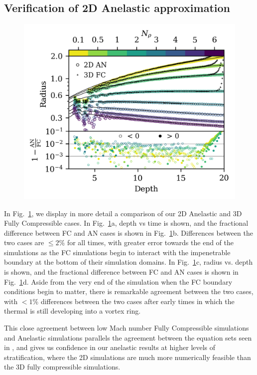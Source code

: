 \documentclass[twocolumn, amsmath, amsfonts, amssymb, trackchanges]{aastex62}
\begin{document}
\subsection{Verification of 2D Anelastic approximation}
\begin{figure}[t!]
    \includegraphics[width=\textwidth]{diff_AN_FC.png}
    \caption{
    \label{fig:diff} }
\end{figure}

In Fig.~\ref{fig:diff}, we display in more detail a comparison of our 2D Anelastic and
3D Fully Compressible cases. In Fig.~\ref{fig:diff}a, depth vs time is shown, and the
fractional difference between FC and AN cases is shown in Fig.~\ref{fig:diff}b.
Differences between the two cases are $\leq 2$\% for all times, with greater error towards
the end of the simulations as the FC simulations begin to interact with the impenetrable
boundary at the bottom of their simulation domains.  In Fig.~\ref{fig:diff}c, radius
vs. depth is shown, and the fractional difference between FC and AN cases is shown in
Fig.~\ref{fig:diff}d. Aside from the very end of the simulation when the FC boundary conditions
begin to matter, there is remarkable agreement between the two cases, with $< 1$\% differences
between the two cases after early times in which the thermal is still developing into a vortex
ring.

This close agreement between low Mach number Fully Compressible simulations and Anelastic
simulations parallels the agreement between the equation sets seen in \citet{lecoanet&all2014},
and gives us confidence in our anelastic results at higher levels of stratification, where
the 2D simulations are much more numerically feasible than the 3D fully compressible simulations.
\end{document}
